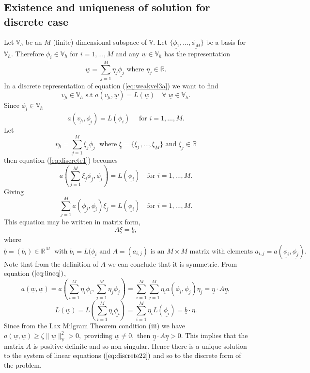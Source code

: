 \documentclass[11pt]{article}
\newcommand{\ul}{\underline}
\newcommand{\bigv}{\mathbb{V}}
\begin{document}
\subsection{Existence and uniqueness of solution for discrete case}
Let $\bigv_h$ be an $M$ (finite) dimensional subspace of $\bigv$. Let $\{\ul{\phi_1},\dots,\ul{\phi_M}\}$ be a basis for $\bigv_h$. Therefore $\ul{\phi_i}\in \bigv_h \text{ for } i = 1,\dots,M$ and any $\ul{w}\in \bigv_h$ has the representation 
\begin{equation}
\label{eq:lineq}
\ul{w} = \sum_{j=1}^M\eta_j\ul{ \phi_j} \text{ where }\eta_j \in \mathbb{R}.
\end{equation}
In a discrete representation of equation (\ref{eq:weakvel3a}) we want to find $$\ul{v_h}\in \bigv_h \text{ s.t } a(\ul{v_h},\ul{w}) = L(\ul{w}) \quad \forall \; \ul{w} \in \bigv_h.$$
Since $\ul{\phi_i} \in \bigv_h$
\begin{equation}
\label{eq:discrete1}
a(\ul{v_h},\ul{\phi_i}) = L(\phi_i) \quad \text{ for } i = 1,\dots,M.
\end{equation}
Let $$\ul{v_h} = \sum_{j=1}^M\xi_j\ul{ \phi_j}\;\text{ where } \ul{\xi} =  \{\ul{\xi_1},\dots,\ul{\xi_M}\} \text{ and } \ul{\xi_j} \in \mathbb{R}$$ then equation (\ref{eq:discrete1}) becomes
$$a( \sum_{j=1}^M\xi_j\ul{ \phi_j},\ul{\phi_i}) = L(\ul{\phi_i})\quad \text{for } i=1,\dots,M.$$
Giving
$$\sum_{j=1}^Ma( \ul{ \phi_j},\ul{\phi_i})\xi_j = L(\ul{\phi_i})\quad \text{for } i=1,\dots,M.$$
This equation may be written in matrix form,
\begin{equation}
\label{eq:discrete22}
A\ul{\xi} = \ul{b},
\end{equation}
where $$\ul{b} = (b_i)\in \mathbb{R}^M\; \text{ with } b_i = L(\ul{\phi_i} \text{ and } A = (a_{i,j}) \text{ is an } M\times{M} \text{ matrix with elements } a_{i,j} = a(\ul{\phi_i},\ul{\phi_j}).$$
Note that from the definition of $A$ we can conclude that it is symmetric. From equation $(\ref{eq:lineq})$,
$$a(\ul{w},\ul{w}) = a(\sum_{i=1}^M\eta_i\ul{ \phi_i},\sum_{j=1}^M\eta_j\ul{ \phi_j}) = \sum_{i=1}^M \sum_{j=1}^M \eta_ia(\ul{\phi_i },\ul{\phi_j })\eta_j = \ul{\eta}\cdot{A}\ul{\eta},$$
$$L(\ul{w}) = L(\sum_{i=1}^M\eta_i\ul{ \phi_i}) = \sum_{i=1}^M\eta_iL(\ul{\phi_i })=\ul{b}\cdot\ul{\eta}.$$
Since from the Lax Milgram Theorem condition (iii) we have $a(\ul{w},\ul{w}) \geq \zeta\|\ul{w}\|_{\bigv}^2 > 0, \text{ providing } \ul{w} \neq 0,$ then $\ul{\eta}\cdot{A}\ul{\eta} > 0.$
This implies that the matrix $A$ is positive definite and so non-singular. Hence there is a unique solution to the system of linear equations $(\ref{eq:discrete22})$ and so to the discrete form of the problem.
\end{document}
